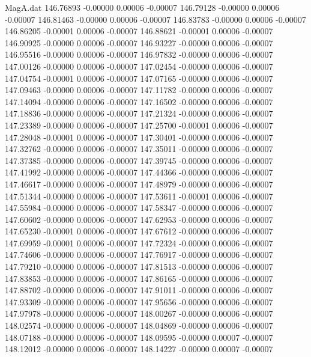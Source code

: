\begin{filecontents}{MagA.dat}
 146.76893   -0.00000    0.00006   -0.00007
 146.79128   -0.00000    0.00006   -0.00007
 146.81463   -0.00000    0.00006   -0.00007
 146.83783   -0.00000    0.00006   -0.00007
 146.86205   -0.00001    0.00006   -0.00007
 146.88621   -0.00001    0.00006   -0.00007
 146.90925   -0.00000    0.00006   -0.00007
 146.93227   -0.00000    0.00006   -0.00007
 146.95516   -0.00000    0.00006   -0.00007
 146.97832   -0.00000    0.00006   -0.00007
 147.00126   -0.00000    0.00006   -0.00007
 147.02454   -0.00000    0.00006   -0.00007
 147.04754   -0.00001    0.00006   -0.00007
 147.07165   -0.00000    0.00006   -0.00007
 147.09463   -0.00000    0.00006   -0.00007
 147.11782   -0.00000    0.00006   -0.00007
 147.14094   -0.00000    0.00006   -0.00007
 147.16502   -0.00000    0.00006   -0.00007
 147.18836   -0.00000    0.00006   -0.00007
 147.21324   -0.00000    0.00006   -0.00007
 147.23389   -0.00000    0.00006   -0.00007
 147.25700   -0.00001    0.00006   -0.00007
 147.28048   -0.00001    0.00006   -0.00007
 147.30401   -0.00000    0.00006   -0.00007
 147.32762   -0.00000    0.00006   -0.00007
 147.35011   -0.00000    0.00006   -0.00007
 147.37385   -0.00000    0.00006   -0.00007
 147.39745   -0.00000    0.00006   -0.00007
 147.41992   -0.00000    0.00006   -0.00007
 147.44366   -0.00000    0.00006   -0.00007
 147.46617   -0.00000    0.00006   -0.00007
 147.48979   -0.00000    0.00006   -0.00007
 147.51344   -0.00000    0.00006   -0.00007
 147.53611   -0.00001    0.00006   -0.00007
 147.55984   -0.00000    0.00006   -0.00007
 147.58347   -0.00000    0.00006   -0.00007
 147.60602   -0.00000    0.00006   -0.00007
 147.62953   -0.00000    0.00006   -0.00007
 147.65230   -0.00001    0.00006   -0.00007
 147.67612   -0.00000    0.00006   -0.00007
 147.69959   -0.00001    0.00006   -0.00007
 147.72324   -0.00000    0.00006   -0.00007
 147.74606   -0.00000    0.00006   -0.00007
 147.76917   -0.00000    0.00006   -0.00007
 147.79210   -0.00000    0.00006   -0.00007
 147.81513   -0.00000    0.00006   -0.00007
 147.83853   -0.00000    0.00006   -0.00007
 147.86165   -0.00000    0.00006   -0.00007
 147.88702   -0.00000    0.00006   -0.00007
 147.91011   -0.00000    0.00006   -0.00007
 147.93309   -0.00000    0.00006   -0.00007
 147.95656   -0.00000    0.00006   -0.00007
 147.97978   -0.00000    0.00006   -0.00007
 148.00267   -0.00000    0.00006   -0.00007
 148.02574   -0.00000    0.00006   -0.00007
 148.04869   -0.00000    0.00006   -0.00007
 148.07188   -0.00000    0.00006   -0.00007
 148.09595   -0.00000    0.00007   -0.00007
 148.12012   -0.00000    0.00006   -0.00007
 148.14227   -0.00000    0.00007   -0.00007

\end{filecontents}
